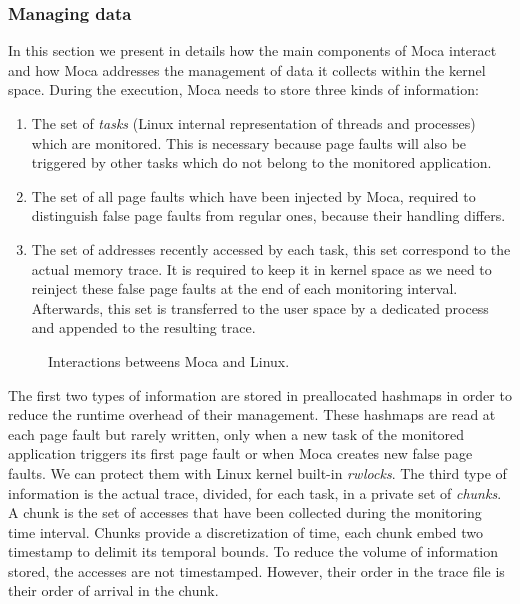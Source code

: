 \subsubsection{Managing data}

In this section we present in details how the main components of \gls{Moca} interact and how \gls{Moca} addresses the management of data it collects within the kernel space.
During the execution, \gls{Moca} needs to store three kinds of information:

\begin{enumerate}
    \item The set of \emph{tasks} (Linux internal representation of threads and processes) which are
monitored.
    This is necessary because page faults will also be triggered by other tasks which do not belong to
    the monitored application.
    \item The set of all page faults which have been injected by \gls{Moca}, required to distinguish false page faults from regular ones, because their handling differs.
    \item The set of addresses recently accessed by each task, this set correspond to the actual memory trace.
        It is required to keep it in kernel space as we need to reinject these false page faults at the end of each monitoring interval.
        Afterwards, this set is transferred to the user space by a dedicated process and appended to the resulting trace.
\end{enumerate}

\begin{figure}[htb]
    \centering
    
    \caption{Interactions betweens Moca and Linux.}
    \label{fig:moca}
\end{figure}

The first two types of information are stored in preallocated hashmaps in order to reduce the runtime overhead of their management.
These hashmaps are read at each page fault but rarely written, only when a new task of the monitored application triggers its first page fault or when \gls{Moca} creates new false page faults.
We can protect them with Linux kernel built-in \emph{rwlocks}.
The third type of information is the actual trace, divided, for each task, in a private set of \emph{chunks}.
A chunk is the set of accesses that have been collected during the monitoring time interval.
Chunks provide a discretization of time, each chunk embed two timestamp to delimit its temporal bounds.
To reduce the volume of information stored, the accesses are not timestamped.
However, their order in the trace file is their order of arrival in the chunk.

